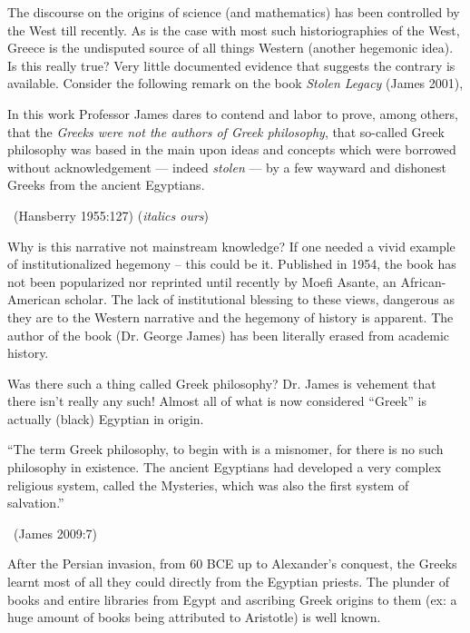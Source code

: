 The discourse on the origins of science (and mathematics) has been controlled by the West till recently. As is the case with most such historiographies of the West, Greece is the undisputed source of all things Western (another hegemonic idea). Is this really true? Very little documented evidence that suggests the contrary is available. Consider the following remark on the book \textit{Stolen Legacy} (James 2001),

\begin{myquote}
In this work Professor James dares to contend and labor to prove, among others, that the \textit{Greeks were not the authors of Greek philosophy}, that so-called Greek philosophy was based in the main upon ideas and concepts which were borrowed without acknowledgement — indeed \textit{stolen} — by a few wayward and dishonest Greeks from the ancient Egyptians. 

~\hfill (Hansberry 1955:127) (\textit{italics ours})
\end{myquote}

Why is this narrative not mainstream knowledge? If one needed a vivid example of institutionalized hegemony – this could be it. Published in 1954, the book has not been popularized nor reprinted until recently by Moefi Asante, an African-American scholar. The lack of institutional blessing to these views, dangerous as they are to the Western narrative and the hegemony of history is apparent. The author of the book (Dr. George James) has been literally erased from academic history.

Was there such a thing called Greek philosophy? Dr. James is vehement that there isn’t really any such! Almost all of what is now considered “Greek” is actually (black) Egyptian in origin.

\begin{myquote}
“The term Greek philosophy, to begin with is a misnomer, for there is no such philosophy in existence. The ancient Egyptians had developed a very complex religious system, called the Mysteries, which was also the first system of salvation.”

\vskip -5pt

~\hfill (James 2009:7)
\end{myquote}

After the Persian invasion, from 60 BCE up to Alexander’s conquest, the Greeks learnt most of all they could directly from the Egyptian priests. The plunder of books and entire libraries from Egypt and ascribing Greek origins to them (ex: a huge amount of books being attributed to Aristotle) is well known.

